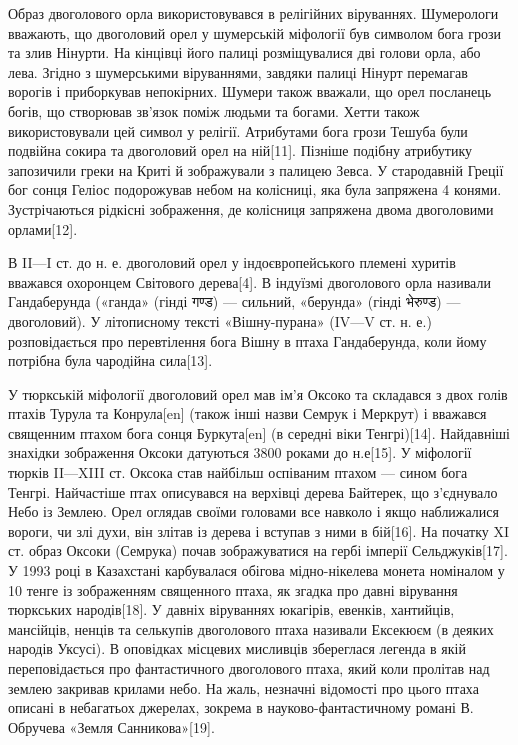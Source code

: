 \begin{multicols}{2}
Образ двоголового орла використовувався в релігійних віруваннях. Шумерологи
вважають, що двоголовий орел у шумерській міфології був символом бога грози та
злив Нінурти. На кінцівці його палиці розміщувалися дві голови орла, або лева.
Згідно з шумерськими віруваннями, завдяки палиці Нінурт перемагав ворогів і
приборкував непокірних. Шумери також вважали, що орел посланець богів, що
створював зв'язок поміж людьми та богами. Хетти також використовували цей
символ у релігії. Атрибутами бога грози Тешуба були подвійна сокира та
двоголовий орел на ній[11]. Пізніше подібну атрибутику запозичили греки на
Криті й зображували з палицею Зевса. У стародавній Греції бог сонця Геліос
подорожував небом на колісниці, яка була запряжена 4 конями. Зустрічаються
рідкісні зображення, де колісниця запряжена двома двоголовими орлами[12].

В II—I ст. до н. е. двоголовий орел у індоєвропейського племені хуритів
вважався охоронцем Світового дерева[4]. В індуїзмі двоголового орла називали
Гандаберунда («ганда» (гінді गण्ड) — сильний, «берунда» (гінді भेरुण्ड) —
двоголовий). У літописному тексті «Вішну-пурана» (IV—V ст. н. е.)
розповідається про перевтілення бога Вішну в птаха Гандаберунда, коли йому
потрібна була чародійна сила[13].

У тюркській міфології двоголовий орел мав ім'я Оксоко та складався з двох голів
птахів Турула та Конрула[en] (також інші назви Семрук і Меркрут) і вважався
священним птахом бога сонця Буркута[en] (в середні віки Тенгрі)[14]. Найдавніші
знахідки зображення Оксоки датуються 3800 роками до н.е[15]. У міфології тюрків
II—XIII ст. Оксока став найбільш оспіваним птахом — сином бога Тенгрі.
Найчастіше птах описувався на верхівці дерева Байтерек, що з'єднувало Небо із
Землею. Орел оглядав своїми головами все навколо і якщо наближалися вороги, чи
злі духи, він злітав із дерева і вступав з ними в бій[16]. На початку XI ст.
образ Оксоки (Семрука) почав зображуватися на гербі імперії Сельджуків[17]. У
1993 році в Казахстані карбувалася обігова мідно-нікелева монета номіналом у 10
тенге із зображенням священного птаха, як згадка про давні вірування тюркських
народів[18]. У давніх віруваннях юкагірів, евенків, хантийців, мансійців,
ненців та селькупів двоголового птаха називали Ексекюєм (в деяких народів
Уксусі). В оповідках місцевих мисливців збереглася легенда в якій
переповідається про фантастичного двоголового птаха, який коли пролітав над
землею закривав крилами небо. На жаль, незначні відомості про цього птаха
описані в небагатьох джерелах, зокрема в науково-фантастичному романі В.
Обручева «Земля Санникова»[19]. 


\end{multicols}
